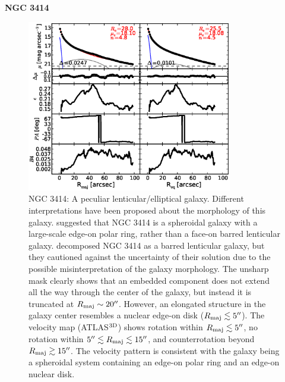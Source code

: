 \documentclass[preprint2]{emulateapj}
\newcommand{\fitfigurewidth}{0.8\textwidth}
\begin{document}
  \clearpage\newpage\noindent
  {\bf NGC 3414 \\}

  \begin{figure}[h]
  \begin{center}
  \includegraphics[width=\fitfigurewidth]{images/n3414_1Dfit.eps}
  \caption{NGC 3414: 
  A peculiar lenticular/elliptical galaxy. 
  Different interpretations have been proposed about the morphology of this galaxy.
  \cite{whitmore1990} suggested that NGC 3414 is a spheroidal galaxy 
  with a large-scale edge-on polar ring, rather than a face-on barred lenticular galaxy.
  \cite{laurikainen2010} decomposed NGC 3414 as a barred lenticular galaxy, but 
  they cautioned against the uncertainty of their solution due to the possible misinterpretation of the galaxy morphology.
  The unsharp mask clearly shows that an embedded component does not extend all the way through the 
  center of the galaxy, but instead it is truncated at $R_{\rm maj} \sim 20''$.
  However, an elongated structure in the galaxy center resembles a nuclear edge-on disk ($R_{\rm maj} \lesssim 5''$).
  The velocity map (ATLAS$^{\rm 3D}$) shows rotation within $R_{\rm maj} \lesssim 5''$, no rotation within $5'' \lesssim R_{\rm maj} \lesssim 15''$,
  and counterrotation beyond $R_{\rm maj} \gtrsim 15''$.
  The velocity pattern is consistent with the galaxy being a spheroidal system containing an edge-on polar ring and an edge-on nuclear disk.
  }
  \end{center}
  \end{figure}
\end{document}
